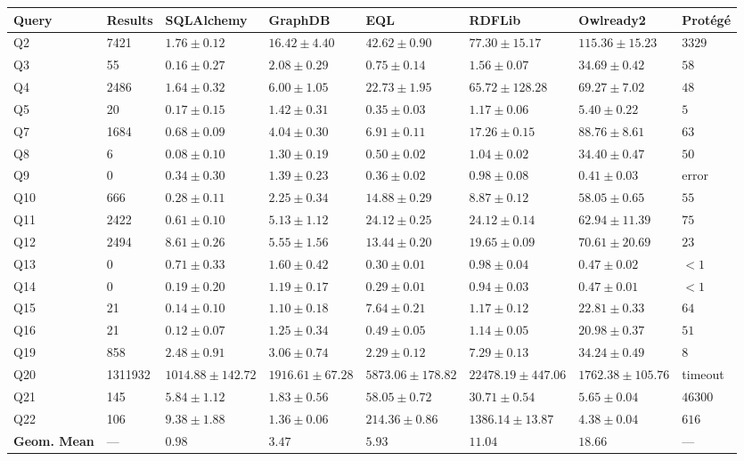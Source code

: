 \begin{tabular}{llllllll}
\toprule
\textbf{Query} & \textbf{Results} & \textbf{SQLAlchemy} & \textbf{GraphDB} & \textbf{EQL} & \textbf{RDFLib} & \textbf{Owlready2} & \textbf{Prot\'eg\'e}\\
\midrule
Q2 & 7421 & $\mathbf{1.76 \pm 0.12}$ & $16.42 \pm 4.40$ & $42.62 \pm 0.90$ & $77.30 \pm 15.17$ & $115.36 \pm 15.23$ & $3329$\\
Q3 & 55 & $\mathbf{0.16 \pm 0.27}$ & $2.08 \pm 0.29$ & $0.75 \pm 0.14$ & $1.56 \pm 0.07$ & $34.69 \pm 0.42$ & $58$\\
Q4 & 2486 & $\mathbf{1.64 \pm 0.32}$ & $6.00 \pm 1.05$ & $22.73 \pm 1.95$ & $65.72 \pm 128.28$ & $69.27 \pm 7.02$ & $48$\\
Q5 & 20 & $\mathbf{0.17 \pm 0.15}$ & $1.42 \pm 0.31$ & $0.35 \pm 0.03$ & $1.17 \pm 0.06$ & $5.40 \pm 0.22$ & $5$\\
Q7 & 1684 & $\mathbf{0.68 \pm 0.09}$ & $4.04 \pm 0.30$ & $6.91 \pm 0.11$ & $17.26 \pm 0.15$ & $88.76 \pm 8.61$ & $63$\\
Q8 & 6 & $\mathbf{0.08 \pm 0.10}$ & $1.30 \pm 0.19$ & $0.50 \pm 0.02$ & $1.04 \pm 0.02$ & $34.40 \pm 0.47$ & $50$\\
Q9 & 0 & $\mathbf{0.34 \pm 0.30}$ & $1.39 \pm 0.23$ & $0.36 \pm 0.02$ & $0.98 \pm 0.08$ & $0.41 \pm 0.03$ & error\\
Q10 & 666 & $\mathbf{0.28 \pm 0.11}$ & $2.25 \pm 0.34$ & $14.88 \pm 0.29$ & $8.87 \pm 0.12$ & $58.05 \pm 0.65$ & $55$\\
Q11 & 2422 & $\mathbf{0.61 \pm 0.10}$ & $5.13 \pm 1.12$ & $24.12 \pm 0.25$ & $24.12 \pm 0.14$ & $62.94 \pm 11.39$ & $75$\\
Q12 & 2494 & $8.61 \pm 0.26$ & $\mathbf{5.55 \pm 1.56}$ & $13.44 \pm 0.20$ & $19.65 \pm 0.09$ & $70.61 \pm 20.69$ & $23$\\
Q13 & 0 & $0.71 \pm 0.33$ & $1.60 \pm 0.42$ & $\mathbf{0.30 \pm 0.01}$ & $0.98 \pm 0.04$ & $0.47 \pm 0.02$ & $<1$\\
Q14 & 0 & $\mathbf{0.19 \pm 0.20}$ & $1.19 \pm 0.17$ & $0.29 \pm 0.01$ & $0.94 \pm 0.03$ & $0.47 \pm 0.01$ & $<1$\\
Q15 & 21 & $\mathbf{0.14 \pm 0.10}$ & $1.10 \pm 0.18$ & $7.64 \pm 0.21$ & $1.17 \pm 0.12$ & $22.81 \pm 0.33$ & $64$\\
Q16 & 21 & $\mathbf{0.12 \pm 0.07}$ & $1.25 \pm 0.34$ & $0.49 \pm 0.05$ & $1.14 \pm 0.05$ & $20.98 \pm 0.37$ & $51$\\
Q19 & 858 & $2.48 \pm 0.91$ & $3.06 \pm 0.74$ & $\mathbf{2.29 \pm 0.12}$ & $7.29 \pm 0.13$ & $34.24 \pm 0.49$ & $8$\\
Q20 & 1311932 & $\mathbf{1014.88 \pm 142.72}$ & $1916.61 \pm 67.28$ & $5873.06 \pm 178.82$ & $22478.19 \pm 447.06$ & $1762.38 \pm 105.76$ & timeout\\
Q21 & 145 & $5.84 \pm 1.12$ & $\mathbf{1.83 \pm 0.56}$ & $58.05 \pm 0.72$ & $30.71 \pm 0.54$ & $5.65 \pm 0.04$ & $46300$\\
Q22 & 106 & $9.38 \pm 1.88$ & $\mathbf{1.36 \pm 0.06}$ & $214.36 \pm 0.86$ & $1386.14 \pm 13.87$ & $4.38 \pm 0.04$ & $616$\\
\midrule
\textbf{Geom. Mean} & --- & $\mathbf{0.98}$ & $3.47$ & $5.93$ & $11.04$ & $18.66$ & ---\\
\bottomrule
\end{tabular}
